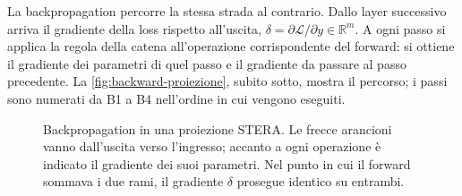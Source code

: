 La backpropagation percorre la stessa strada al contrario. Dallo layer successivo arriva il gradiente della loss rispetto all'uscita, $\delta=\partial\mathcal L/\partial y\in\mathbb{R}^m$. A ogni passo si applica la regola della catena all'operazione corrispondente del forward: si ottiene il gradiente dei parametri di quel passo e il gradiente da passare al passo precedente. La \autoref{fig:backward-proiezione}, subito sotto, mostra il percorso; i passi sono numerati da B1 a B4 nell'ordine in cui vengono eseguiti.

\begin{figure}[H]
\centering
\resizebox{\linewidth}{!}{}
\caption{Backpropagation in una proiezione STERA. Le frecce arancioni vanno dall'uscita verso l'ingresso; accanto a ogni operazione è indicato il gradiente dei suoi parametri. Nel punto in cui il forward sommava i due rami, il gradiente $\delta$ prosegue identico su entrambi.}
\label{fig:backward-proiezione}
\end{figure}

